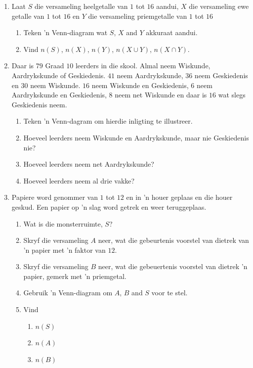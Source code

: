 \begin{exercises}{}
{
  \begin{enumerate}[itemsep=5pt, label=\textbf{\arabic*}.]
  \item  Laat $S$ die versameling heelgetalle van $1$ tot $16$ aandui, $X$
    die versameling ewe getalle van $1$ tot $16$ en $Y$ die versameling priemgetalle van $1$ tot $16$
    \begin{enumerate}[noitemsep, label=\textbf{(\alph*)} ]
    \item Teken 'n Venn-diagram wat $S$, $X$ and $Y$ akkuraat aandui.
    \item Vind $n\left(S\right)$, $n\left(X\right)$, $n\left(Y\right)$,
      $n\left(X\cup Y\right)$, $n\left(X\cap Y\right)$.
    \end{enumerate}
  \item Daar is $79$ Graad $10$ leerders in die skool. Almal neem Wiskunde, Aardrykskunde of Geskiedenis. $41$ neem Aardrykskunde, $36$ neem Geskiedenis en $30$ neem Wiskunde. $16$ neem Wiskunde en Geskiedenis, $6$ neem Aardrykskunde en Geskiedenis, $8$ neem net Wiskunde en daar is $16$ wat slegs Geskiedenis neem.
    \begin{enumerate}[noitemsep, label=\textbf{(\alph*)} ]
    \item Teken 'n Venn-dagram om hierdie inligting te illustreer.
    \item Hoeveel leerders neem Wiskunde en Aardrykskunde, maar nie Geskiedenis nie?
    \item Hoeveel leerders neem net Aardrykskunde?
    \item Hoeveel leerders neem al drie vakke?
    \end{enumerate}
  \item Papiere word genommer van $1$ tot $12$ en in 'n houer geplaas en die houer geskud. Een papier op 'n slag word getrek en weer teruggeplaas.
    \begin{enumerate}[noitemsep, label=\textbf{(\alph*)} ]
    \item Wat is die monsterruimte, $S$?
    \item Skryf die versameling $A$ neer, wat die gebeurtenis voorstel van dietrek van 'n papier met 'n faktor van $12$.
    \item Skryf die versameling $B$ neer, wat die gebeuertenis voorstel van dietrek 'n papier, gemerk met 'n priemgetal.
    \item Gebruik 'n Venn-diagram om $A$, $B$ and $S$ voor te stel.
    \item Vind
      \begin{enumerate}[noitemsep, label=\textbf{\roman*.} ]
      \item $n\left(S\right)$
      \item $n\left(A\right)$
      \item $n\left(B\right)$

      \end{enumerate}

    \end{enumerate}
 \end{enumerate}

}
\end{exercises}

